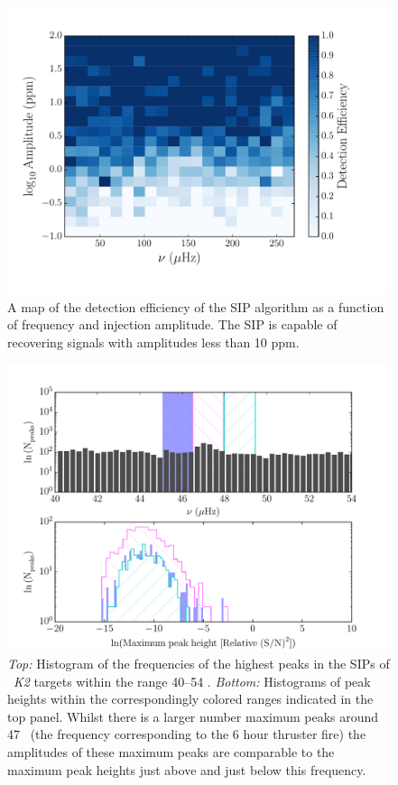 \begin{figure}[h]
\begin{center}
\includegraphics[width=6in, clip=true]{figures/hist.pdf}
\caption[SIP detection efficiency.]
{A map of the detection efficiency of the SIP algorithm as a function
of frequency and injection amplitude. The SIP is capable of recovering
signals with amplitudes less than 10 ppm.}
\label{fig:map}
\end{center}
\end{figure}

\begin{figure}[h]
\begin{center}
\includegraphics[width=6in, clip=true]{figures/sip_hist.pdf}
\caption[How insensitive is the SIP?]
{{\it Top:} Histogram of the frequencies of the highest peaks in the
	SIPs of \nGO\ {\it K2} targets within the range 40--54 \uHz.
	{\it Bottom:} Histograms of peak heights within the correspondingly
	colored ranges indicated in the top panel.
	Whilst there is a larger number maximum peaks around 47 \uHz\ (the
	frequency corresponding to the 6 hour thruster fire) the amplitudes of
	these maximum peaks are comparable to the maximum peak heights just
	above and just below this frequency.}
\label{fig:sip_hist}
\end{center}
\end{figure}

